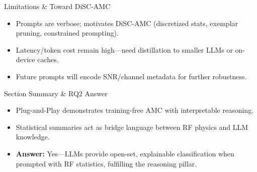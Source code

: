 \begin{frame}{Limitations \& Toward DiSC-AMC}
    \begin{itemize}
        \item Prompts are verbose; motivates DiSC-AMC (discretized stats, exemplar pruning, constrained prompting).
        \item Latency/token cost remain high—need distillation to smaller LLMs or on-device caches.
        \item Future prompts will encode SNR/channel metadata for further robustness.
    \end{itemize}
\end{frame}

\begin{frame}{Section Summary \& RQ2 Answer}
    \begin{itemize}
        \item Plug-and-Play demonstrates training-free AMC with interpretable reasoning.
        \item Statistical summaries act as bridge language between RF physics and LLM knowledge.
        \item \textbf{Answer:} Yes—LLMs provide open-set, explainable classification when prompted with RF statistics, fulfilling the reasoning pillar.
    \end{itemize}
\end{frame}

